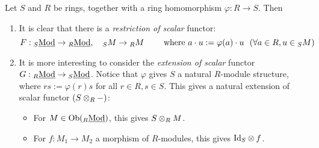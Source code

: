 \documentclass{article}
\begin{document}
Let $S$ and $R$ be rings, together with a ring homomorphism $\varphi: R \to S$. Then 
\begin{enumerate}
    \item It is clear that there is a \emph{restriction of scalar} functor:
    \[
        F: \catlmod{S} \to \catlmod{R}, \quad _SM \to {_RM} \qquad \text{ where } a\cdot u := \varphi(a)\cdot u\ \ (\forall a\in R, u\in {_SM})
    \]
    \item It is more interesting to consider the \emph{extension of scalar} functor $G: {}_{R}\underline{\textup{Mod}} \to {}_{S}\underline{\textup{Mod}}$. Notice that $\varphi$ gives $S$ a natural $R$-module structure, where $rs := \varphi(r)s$ for all $r \in R, s\in S$. This gives a natural extension of scalar functor $(S \otimes_R -)$:
    \begin{itemize}
        \item For $M \in \mathrm{Ob}({}_{R}\underline{\textup{Mod}})$, this gives $S \otimes_R M$.
        \item For $f: M_1 \to M_2$ a morphism of $R$-modules, this gives $\mathrm{Id}_S \otimes f$.
    \end{itemize}
\end{enumerate}
\end{document}

